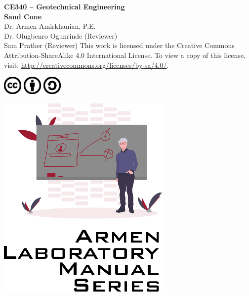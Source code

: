 \documentclass[12pt]{article}
\newcommand{\CourseNum}{CE340}
\newcommand{\CourseName}{Geotechnical Engineering}
\newcommand{\LabTitle}{Sand Cone}
\begin{document}
\begin{titlepage}
\begin{flushright}
\LARGE{\textbf{\CourseNum{} -- \CourseName}}\\
\vfill
\Huge{\textbf{\LabTitle}}\\
    \vfill
    \large Dr. Armen Amirkhanian, P.E.\\
    \normalsize Dr. Olugbenro Ogunrinde (Reviewer)\\
    \normalsize Sam Prather (Reviewer)
\vfill
\normalsize This work is licensed under the Creative Commons Attribution-ShareAlike 4.0 International License. To view a copy of this license, visit:
\href{http://creativecommons.org/licenses/by-sa/4.0/}{http://creativecommons.org/licenses/by-sa/4.0/}.

\includegraphics[width=0.07\textwidth]{cc.eps}
\includegraphics[width=0.07\textwidth]{by.eps}
\includegraphics[width=0.07\textwidth]{sa.eps}
\vfill

\includegraphics[width=0.3\linewidth]{Logo.eps}\\ 
 
  
\end{flushright}
\end{titlepage}
\end{document}
